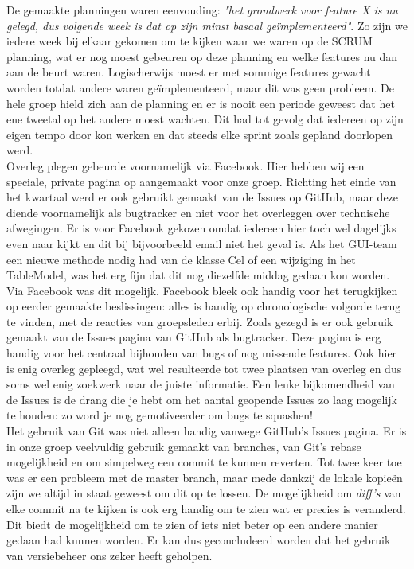 \documentclass[a4paper,11pt]{article}
\begin{document}
De gemaakte planningen waren eenvouding: \textit{"het grondwerk voor feature X is nu gelegd, dus volgende week is dat op zijn minst basaal geïmplementeerd"}. Zo zijn we iedere week bij elkaar gekomen om te kijken waar we waren op de SCRUM planning, wat er nog moest gebeuren op deze planning en welke features nu dan aan de beurt waren. Logischerwijs moest er met sommige features gewacht worden totdat andere waren ge\"{i}mplementeerd, maar dit was geen probleem. De hele groep hield zich aan de planning en er is nooit een periode geweest dat het ene tweetal op het andere moest wachten. Dit had tot gevolg dat iedereen op zijn eigen tempo door kon werken en dat steeds elke sprint zoals gepland doorlopen werd.\\

Overleg plegen gebeurde voornamelijk via Facebook. Hier hebben wij een speciale, private pagina op aangemaakt voor onze groep. Richting het einde van het kwartaal werd er ook gebruikt gemaakt van de Issues op GitHub, maar deze diende voornamelijk als bugtracker en niet voor het overleggen over technische afwegingen. Er is voor Facebook gekozen omdat iedereen hier toch wel dagelijks even naar kijkt en dit bij bijvoorbeeld email niet het geval is. Als het GUI-team een nieuwe methode nodig had van de klasse Cel of een wijziging in het TableModel, was het erg fijn dat dit nog diezelfde middag gedaan kon worden. Via Facebook was dit mogelijk. Facebook bleek ook handig voor het terugkijken op eerder gemaakte beslissingen: alles is handig op chronologische volgorde terug te vinden, met de reacties van groepsleden erbij. Zoals gezegd is er ook gebruik gemaakt van de Issues pagina van GitHub als bugtracker. Deze pagina is erg handig voor het centraal bijhouden van bugs of nog missende features. Ook hier is enig overleg gepleegd, wat wel resulteerde tot twee plaatsen van overleg en dus soms wel enig zoekwerk naar de juiste informatie. Een leuke bijkomendheid van de Issues is de drang die je hebt om het aantal geopende Issues zo laag mogelijk te houden: zo word je nog gemotiveerder om bugs te squashen!\\

Het gebruik van Git was niet alleen handig vanwege GitHub’s Issues pagina. Er is in onze groep veelvuldig gebruik gemaakt van branches, van Git’s rebase mogelijkheid en om simpelweg een commit te kunnen reverten. Tot twee keer toe was er een probleem met de master branch, maar mede dankzij de lokale kopieën zijn we altijd in staat geweest om dit op te lossen. De mogelijkheid om \textit{diff’s} van elke commit na te kijken is ook erg handig om te zien wat er precies is veranderd. Dit biedt de mogelijkheid om te zien of iets niet beter op een andere manier gedaan had kunnen worden. Er kan dus geconcludeerd worden dat het gebruik van versiebeheer ons zeker heeft geholpen.\\
\end{document}
